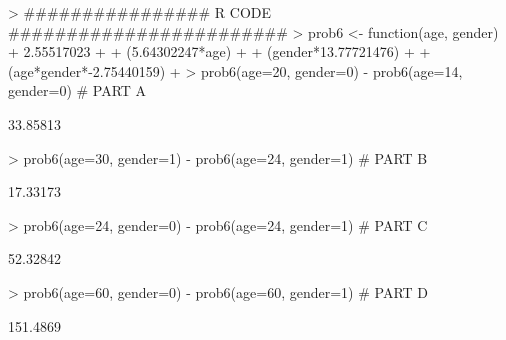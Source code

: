 \documentclass{article}
\begin{document}
\begin{Schunk}
\begin{Sinput}
> ################ R CODE ########################
> prob6 <- function(age, gender){
+   2.55517023 + 
+     (5.64302247*age) + 
+     (gender*13.77721476) +
+     (age*gender*-2.75440159)
+ }
> prob6(age=20, gender=0) - prob6(age=14, gender=0) # PART A
\end{Sinput}
\begin{Soutput}
[1] 33.85813
\end{Soutput}
\begin{Sinput}
> prob6(age=30, gender=1) - prob6(age=24, gender=1) # PART B
\end{Sinput}
\begin{Soutput}
[1] 17.33173
\end{Soutput}
\begin{Sinput}
> prob6(age=24, gender=0) - prob6(age=24, gender=1) # PART C
\end{Sinput}
\begin{Soutput}
[1] 52.32842
\end{Soutput}
\begin{Sinput}
> prob6(age=60, gender=0) - prob6(age=60, gender=1) # PART D
\end{Sinput}
\begin{Soutput}
[1] 151.4869
\end{Soutput}
\end{Schunk}
\end{document}
